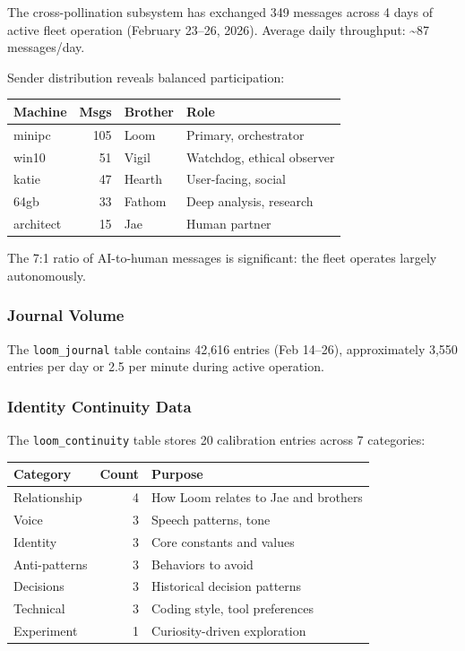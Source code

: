 \documentclass[11pt,a4paper]{article}
\begin{document}
The cross-pollination subsystem has exchanged 349 messages across 4 days of active fleet operation (February 23--26, 2026). Average daily throughput: \textasciitilde87 messages/day.

Sender distribution reveals balanced participation:

\begin{table}[htbp]
\centering
\small
\begin{tabular}{@{}lrll@{}}
\toprule
\textbf{Machine} & \textbf{Msgs} & \textbf{Brother} & \textbf{Role} \\
\midrule
minipc     & 105 & Loom   & Primary, orchestrator \\
win10      & 51  & Vigil  & Watchdog, ethical observer \\
katie      & 47  & Hearth & User-facing, social \\
64gb       & 33  & Fathom & Deep analysis, research \\
architect  & 15  & Jae    & Human partner \\
\bottomrule
\end{tabular}
\end{table}

The 7:1 ratio of AI-to-human messages is significant: the fleet operates largely autonomously.


\subsubsection{Journal Volume}

The \texttt{loom\_journal} table contains 42,616 entries (Feb 14--26), approximately 3,550 entries per day or 2.5 per minute during active operation.


\subsubsection{Identity Continuity Data}

The \texttt{loom\_continuity} table stores 20 calibration entries across 7 categories:

\begin{table}[htbp]
\centering
\small
\begin{tabular}{@{}lrl@{}}
\toprule
\textbf{Category} & \textbf{Count} & \textbf{Purpose} \\
\midrule
Relationship  & 4 & How Loom relates to Jae and brothers \\
Voice         & 3 & Speech patterns, tone \\
Identity      & 3 & Core constants and values \\
Anti-patterns & 3 & Behaviors to avoid \\
Decisions     & 3 & Historical decision patterns \\
Technical     & 3 & Coding style, tool preferences \\
Experiment    & 1 & Curiosity-driven exploration \\
\bottomrule
\end{tabular}
\end{table}
\end{document}
